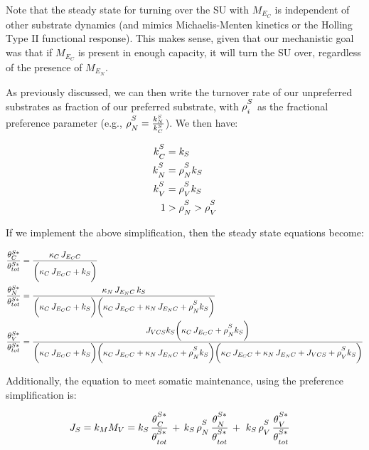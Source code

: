 \documentclass[
]{article}
\begin{document}
Note that the steady state for turning over the SU with \(M_{E_C}\) is
independent of other substrate dynamics (and mimics Michaelis-Menten
kinetics or the Holling Type II functional response). This makes sense,
given that our mechanistic goal was that if \(M_{E_C}\) is present in
enough capacity, it will turn the SU over, regardless of the presence of
\(M_{E_N}\).

As previously discussed, we can then write the turnover rate of our
unpreferred substrates as fraction of our preferred substrate, with
\(\rho\strut^S_i\) as the fractional preference parameter (e.g.,
\(\rho\strut^S_N = \frac{k^S_N}{k^S_C}\)). We then have:

\begin{align}
{k\strut^S_C} &= k_S
\\
{k\strut^S_N} &= {\rho\strut^S_N}{k_S}
\\
{k\strut^S_V} &= {\rho\strut^S_V}{k_S}
\\
1 &> {\rho\strut^S_N} > {\rho\strut^S_V}
\end{align}

If we implement the above simplification, then the steady state
equations become:

\begin{align}
\frac{\theta^{S*}_C}{\theta^{S*}_{tot}} &= \frac{{\kappa_C}\,{J_{{E_C}C}}}{\biggl({\kappa_C}\,{J_{{E_C}C}} + {k_S}\biggr)}
\\
\frac{\theta^{S*}_N}{\theta^{S*}_{tot}}&= \frac{{\kappa_N}\,{J_{{E_N}C}}\,{k_S}}{\biggl({\kappa_C}\,{J_{{E_C}C}} + {k_S}\biggr)\biggl({\kappa_C}\,{J_{{E_C}C}} + {\kappa_N}\,{J_{{E_N}C}} + {\rho\strut^S_N}{k_S}\biggr)}
\\
\frac{\theta^{S*}_V}{\theta^{S*}_{tot}}&= \frac{{J_{VCS}}{k_S}\biggl({\kappa_C}\,{J_{{E_C}C}} + {\rho\strut^S_N}{k_S}\biggr)}{\biggl({\kappa_C}\,{J_{{E_C}C}} + {k_S}\biggr)\biggl({\kappa_C}\,{J_{{E_C}C}} + {\kappa_N}\,{J_{{E_N}C}} + {\rho\strut^S_N}{k_S}\biggr)\biggl({\kappa_C}\,{J_{{E_C}C}} + {\kappa_N}\,{J_{{E_N}C}} + {J_{VCS}} + {\rho\strut^S_V}{k_S}\biggr)}
\end{align}

Additionally, the equation to meet somatic maintenance, using the
preference simplification is:

\begin{align}
J_S &= {k_M}{M_V} = k_S\,\frac{\theta\strut^{S*}_C}{\theta\strut^{S*}_{tot}} \,+\, k_S\,\rho\strut^S_N\,\frac{\theta\strut^{S*}_N}{\theta\strut^{S*}_{tot}} \,+\, \,k_S\,\rho\strut^S_V\,\frac{\theta\strut^{S*}_V}{\theta\strut^{S*}_{tot}}
\end{align}
\end{document}

